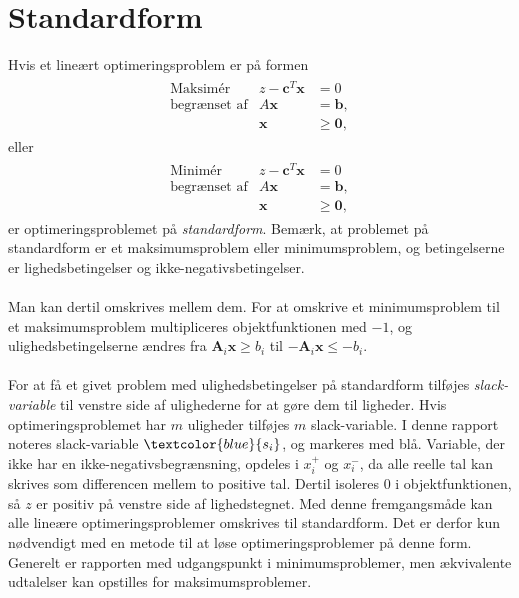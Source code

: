 \section{Standardform}
\label{sec:standard}
% 
Hvis et lineært optimeringsproblem er på formen
%
\begin{align*}
\begin{array}{lrl}
\text{Maksimér}		&z - \textbf{c}^T\textbf{x}	&	=0		\\
\text{begrænset af}	&A\textbf{x}	&=\mathbf{b},	\\
					&\mathbf{x}				&\geq \mathbf{0},
\end{array}
\end{align*}
eller
\begin{align*}
\begin{array}{lrl}
\text{Minimér}		&z - \textbf{c}^T\textbf{x}	&	=0		\\
\text{begrænset af}	&A\textbf{x}	&=\mathbf{b},	\\
					&\mathbf{x}				&\geq \mathbf{0},
\end{array}
\end{align*}
%
er optimeringsproblemet på \textit{standardform}.
Bemærk, at problemet på standardform er et maksimumsproblem eller minimumsproblem, og betingelserne er lighedsbetingelser og ikke-negativsbetingelser.
\\\\
%
Man kan dertil omskrives mellem dem.
For at omskrive et minimumsproblem til et maksimumsproblem multipliceres objektfunktionen med $-1$, og ulighedsbetingelserne ændres fra $\textbf{A}_i \textbf{x} \geq b_i$ til $-\textbf{A}_i \textbf{x} \leq -b_i$.
\\\\
%
For at få et givet problem med ulighedsbetingelser på standardform tilføjes \textit{slack-variable} til venstre side af ulighederne for at gøre dem til ligheder. 
Hvis optimeringsproblemet har $m$ uligheder tilføjes $m$ slack-variable.
I denne rapport noteres slack-variable $\textcolor{blue}{s_i}$, og markeres med blå.
Variable, der ikke har en ikke-negativsbegrænsning, opdeles i $x_i^+$ og $x_i^-$, da alle reelle tal kan skrives som differencen mellem to positive tal.
Dertil isoleres $0$ i objektfunktionen, så $z$ er positiv på venstre side af lighedstegnet.
Med denne fremgangsmåde kan alle lineære optimeringsproblemer omskrives til standardform.
Det er derfor kun nødvendigt med en metode til at løse optimeringsproblemer på denne form.
Generelt er rapporten med udgangspunkt i minimumsproblemer, men ækvivalente udtalelser kan opstilles for maksimumsproblemer.
%

